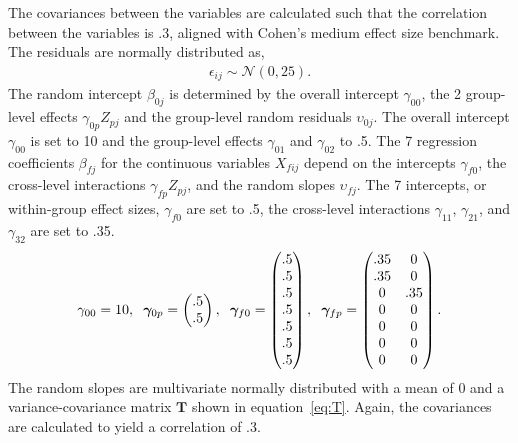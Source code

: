 \documentclass[3p,12pt,a4paper]{elsarticle}
\begin{document}
The covariances between the variables are calculated such that the correlation between the variables is .3, aligned with Cohen's \citeyearpar{cohen1990} medium effect size benchmark. The residuals are normally distributed as,
\begin{align}
    \epsilon_{ij} \sim \mathcal{N}(0, 25).
\end{align}
The random intercept $\beta_{0j}$ is determined by the overall intercept $\gamma_{00}$, the 2 group-level effects $\gamma_{0p}Z_{pj}$ and the group-level random residuals $\upsilon_{0j}$. The overall intercept $\gamma_{00}$ is set to 10 and the group-level effects $\gamma_{01}$ and $\gamma_{02}$ to .5.
The 7 regression coefficients $\beta_{fj}$ for the continuous variables $X_{fij}$ depend on the intercepts $\gamma_{f0}$, the cross-level interactions $\gamma_{fp}Z_{pj}$, and the random slopes $\upsilon_{fj}$. The 7 intercepts, or within-group effect sizes, $\gamma_{f0}$ are set to .5, the cross-level interactions $\gamma_{11}$, $\gamma_{21}$, and $\gamma_{32}$ are set to .35.
\begin{align}
    \gamma_{00} = 10, \hspace{.2cm} \boldsymbol{\gamma}_{0p} = \begin{pmatrix}
        .5 \\ .5
        \end{pmatrix}, \hspace{.2cm} \boldsymbol{\gamma}_{f0} = \begin{pmatrix}
        .5 \\ .5 \\ .5 \\ .5 \\ .5 \\ .5 \\ .5
        \end{pmatrix}, \hspace{.2cm} \boldsymbol{\gamma}_{fp} = \begin{pmatrix}
        .35 & 0 \\ .35 & 0 \\ 0 & .35 \\ 0 & 0 \\ 0 & 0 \\ 0 & 0 \\ 0 & 0
        \end{pmatrix}.
\end{align}
The random slopes are multivariate normally distributed with a mean of 0 and a variance-covariance matrix $\mathbf{T}$ shown in equation~\ref{eq:T}. Again, the covariances are calculated to yield a correlation of .3.
\end{document}

